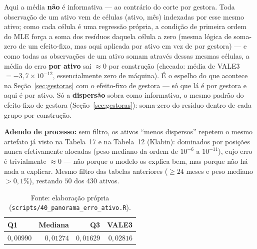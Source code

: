 \documentclass[11pt,a4paper]{article}
\begin{document}
Aqui a média \textbf{não} é informativa --- ao contrário do corte por gestora. Toda observação de
um ativo vem de células (ativo, mês) indexadas por esse mesmo ativo; como cada célula é uma
regressão própria, a condição de primeira ordem do MLE força a soma dos resíduos daquela célula a
zero (mesma lógica de soma-zero de um efeito-fixo, mas aqui aplicada por ativo em vez de por
gestora) --- e como todas as observações de um ativo somam através dessas mesmas células, a média
do erro \textbf{por ativo} sai $\approx0$ por construção (checado: média de VALE3 $=-3{,}7\times
10^{-12}$, essencialmente zero de máquina). É o espelho do que acontece na Seção~\ref{sec:gestoras}
com o efeito-fixo de gestora --- só que lá é por gestora e aqui é por ativo. Só a
\textbf{dispersão} sobra como informativa, o mesmo padrão do efeito-fixo de gestora
(Seção~\ref{sec:gestoras}): soma-zero do resíduo dentro de cada grupo por construção.

\textbf{Adendo de processo:} sem filtro, os ativos ``menos dispersos'' repetem o mesmo artefato já
visto na Tabela~17 e na Tabela~12 (Klabin): dominados por posições nunca efetivamente alocadas
(peso mediano da ordem de $10^{-6}$ a $10^{-11}$), cujo erro é trivialmente $\approx0$ --- não
porque o modelo os explica bem, mas porque não há nada a explicar. Mesmo filtro das tabelas
anteriores ($\geq24$ meses e peso mediano $>0{,}1\%$), restando $50$ dos $430$ ativos.

\begin{table}[h]\centering\small
\caption{Distribuição da dispersão do erro (dp) entre os 50 ativos com posição relevante, com
VALE3 para referência.}
\begin{tabular}{@{}lrrr@{}}
\toprule
Q1 & Mediana & Q3 & VALE3 \\
\midrule
$0{,}00990$ & $0{,}01274$ & $0{,}01629$ & $0{,}02816$ \\
\bottomrule
\end{tabular}
\caption*{\footnotesize Fonte: elaboração própria (\texttt{scripts/40\_panorama\_erro\_ativo.R}).}
\end{table}
\end{document}
